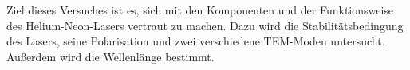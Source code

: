 Ziel dieses Versuches ist es, sich mit den Komponenten und der Funktionsweise des Helium-Neon-Lasers vertraut zu machen.
Dazu wird die Stabilitätsbedingung des Lasers, seine Polarisation und zwei verschiedene TEM-Moden untersucht. Außerdem
wird die Wellenlänge bestimmt.
